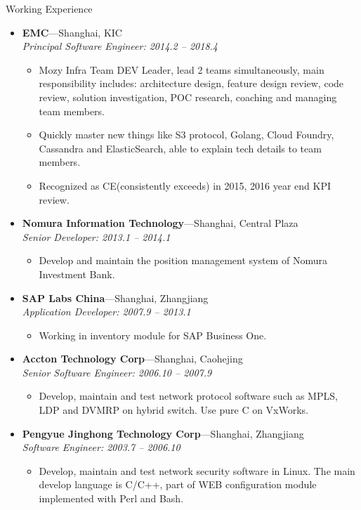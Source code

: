 \documentclass[11pt,oneside]{article}
\newenvironment{ressection}[1]{
	\vspace{4pt}
	{\selectfont\Large#1}
	\begin{itemize}
	\vspace{3pt}
}{
	\end{itemize}
}
\newcommand{\ressubitem}[1]{
	\vspace{-1pt}
	\item \begin{flushleft} #1 \end{flushleft}
}
\newcommand{\resbigitem}[3]{
	\vspace{-5pt}
	\item
	\textbf{#1}---#2 \\
	\textit{#3}
}
\newenvironment{ressubsec}[3]{
	\resbigitem{#1}{#2}{#3}
	\vspace{-2pt}
	\begin{itemize}
}{
    \end{itemize}
}
\begin{document}
\begin{ressection}{Working Experience}
	\begin{ressubsec}{EMC}{Shanghai, KIC}{Principal Software Engineer: 2014.2 -- 2018.4}
		\ressubitem{Mozy Infra Team DEV Leader, lead 2 teams simultaneously, main responsibility includes: architecture design, feature design review, code review, solution investigation, POC research, coaching and managing team members.}
		\ressubitem{Quickly master new things like S3 protocol, Golang, Cloud Foundry, Cassandra and ElasticSearch, able to explain tech details to team members.}
		\ressubitem{Recognized as CE(consistently exceeds) in 2015, 2016 year end KPI review.}
	\end{ressubsec}

	\begin{ressubsec}{Nomura Information Technology}{Shanghai, Central Plaza}{Senior Developer: 2013.1 -- 2014.1}
		\ressubitem{Develop and maintain the position management system of Nomura Investment Bank.}
	\end{ressubsec}

	\begin{ressubsec}{SAP Labs China}{Shanghai, Zhangjiang}{Application Developer: 2007.9 -- 2013.1}
		\ressubitem{Working in inventory module for SAP Business One.}
	\end{ressubsec}

	\begin{ressubsec}{Accton Technology Corp}{Shanghai, Caohejing}{Senior Software Engineer: 2006.10 -- 2007.9}
		\ressubitem{Develop, maintain and test network protocol software such as MPLS, LDP and DVMRP on
			hybrid switch. Use pure C on VxWorks.}
	\end{ressubsec}

	\begin{ressubsec}{Pengyue Jinghong Technology Corp}{Shanghai, Zhangjiang}{Software Engineer: 2003.7 -- 2006.10}
		\ressubitem{Develop, maintain and test network security software in Linux. The main develop
			language is C/C++, part of WEB configuration module implemented with Perl and Bash.}
	\end{ressubsec}

\end{ressection}
\end{document}

